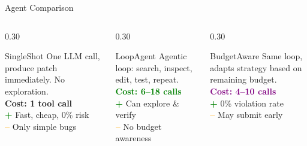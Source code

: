 \documentclass[aspectratio=169, 12pt]{beamer}
\begin{document}
\begin{frame}{Agent Comparison}

\begin{columns}[T]
  \begin{column}{0.30\textwidth}
    \begin{block}{\centering SingleShot}
      {\footnotesize
        One LLM call, produce patch immediately. No exploration.\\[0.2cm]
        \colorbox{accent!15}{\textcolor{accent}{\textbf{Cost: 1 tool call}}}\\[0.2cm]
        \textcolor{green}{\textbf{+}} Fast, cheap, 0\% risk\\
        \textcolor{orange}{\textbf{--}} Only simple bugs
      }
    \end{block}
  \end{column}
  \begin{column}{0.30\textwidth}
    \begin{block}{\centering LoopAgent}
      {\footnotesize
        Agentic loop: search, inspect, edit, test, repeat.\\[0.2cm]
        \colorbox{green!15}{\textcolor{green}{\textbf{Cost: 6--18 calls}}}\\[0.2cm]
        \textcolor{green}{\textbf{+}} Can explore \& verify\\
        \textcolor{orange}{\textbf{--}} No budget awareness
      }
    \end{block}
  \end{column}
  \begin{column}{0.30\textwidth}
    \begin{block}{\centering BudgetAware}
      {\footnotesize
        Same loop, adapts strategy based on remaining budget.\\[0.2cm]
        \colorbox{purple!15}{\textcolor{purple}{\textbf{Cost: 4--10 calls}}}\\[0.2cm]
        \textcolor{green}{\textbf{+}} 0\% violation rate\\
        \textcolor{orange}{\textbf{--}} May submit early
      }
    \end{block}
  \end{column}
\end{columns}

\end{frame}
\end{document}
